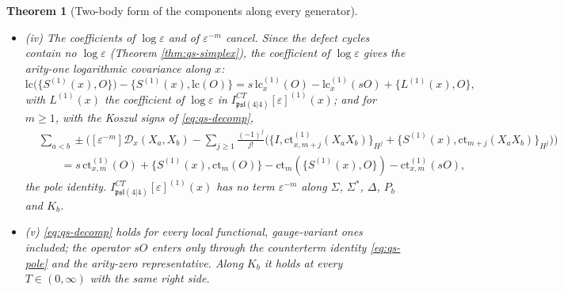 \documentclass[11pt]{article}
\numberwithin{equation}{section}
\theoremstyle{plain}
\newtheorem{theorem}{Theorem}[section]
\theoremstyle{definition}
\begin{document}
\begin{theorem}[Two-body form of the components along every generator]
\begin{itemize}
\begin{equation}
\label{eq:qs-decomp}
\end{equation}
the two-body kernel $\Upsilon_x$ of Definition \ref{def:qs-defect} (iv) summed over the unordered pairs of letters, and a one-body term, the bracket with the arity-one finite counterterm along $x$, a derivation of the letters.
\item (iv) The coefficients of $\log\varepsilon$ and of $\varepsilon^{-m}$ cancel. Since the defect cycles contain no $\log\varepsilon$ (Theorem \ref{thm:qs-simplex}), the coefficient of $\log\varepsilon$ gives the arity-one logarithmic covariance along $x$:
\begin{equation}
\mathrm{lc}\big(\{S^{(1)}(x),O\}\big)-\big\{S^{(1)}(x),\mathrm{lc}(O)\big\}=s\,\mathrm{lc}^{(1)}_x(O)-\mathrm{lc}^{(1)}_x(sO)+\big\{L^{(1)}(x),O\big\},
\label{eq:qs-logcov}
\end{equation}
with $L^{(1)}(x)$ the coefficient of $\log\varepsilon$ in $I^{CT}_{\mathfrak{psl}(4|4)}[\varepsilon]^{(1)}(x)$; and for $m\ge1$, with the Koszul signs of \eqref{eq:qs-decomp},
\begin{equation}
\begin{aligned}
&\sum_{a<b}\pm\Big([\varepsilon^{-m}]\mathcal D_x(X_a,X_b)-\sum_{j\ge1}\tfrac{(-1)^j}{j!}\Big(\big\{I,\mathrm{ct}^{(1)}_{x,m+j}(X_aX_b)\big\}_{H^j}+\big\{S^{(1)}(x),\mathrm{ct}_{m+j}(X_aX_b)\big\}_{H^j}\Big)\Big)\\
&\qquad=s\,\mathrm{ct}^{(1)}_{x,m}(O)+\{S^{(1)}(x),\mathrm{ct}_m(O)\}-\mathrm{ct}_m(\{S^{(1)}(x),O\})-\mathrm{ct}^{(1)}_{x,m}(sO),
\end{aligned}
\label{eq:qs-pole}
\end{equation}
the pole identity. $I^{CT}_{\mathfrak{psl}(4|4)}[\varepsilon]^{(1)}(x)$ has no term $\varepsilon^{-m}$ along $\Sigma$, $\Sigma^*$, $\Delta$, $P_b$ and $K_b$.
\item (v) \eqref{eq:qs-decomp} holds for every local functional, gauge-variant ones included; the operator $sO$ enters only through the counterterm identity \eqref{eq:qs-pole} and the arity-zero representative. Along $K_b$ it holds at every $T\in(0,\infty)$ with the same right side.
\end{itemize}
\end{theorem}
\end{document}
